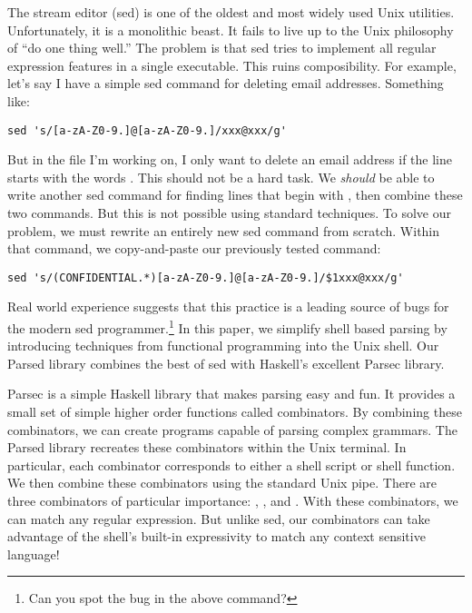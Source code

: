 \documentclass{sigplanconf}
\renewcommand{\emph}[1]{{\textit{#1}}}
\newcommand{\sh}[1]{{\ttfamily {#1}}}
\begin{document}
The stream editor (sed) is one of the oldest and most widely used Unix utilities.
Unfortunately, it is a monolithic beast.
It fails to live up to the Unix philosophy of ``do one thing well.''
The problem is that sed tries to implement all regular expression features in a single executable.
This ruins composibility.
For example, let's say I have a simple sed command for deleting email addresses.
Something like:
\begin{lstlisting}
sed 's/[a-zA-Z0-9.]@[a-zA-Z0-9.]/xxx@xxx/g'
\end{lstlisting}
But in the file I'm working on, I only want to delete an email address if the line starts with the words \sh{CONFIDENTIAL}.
This should not be a hard task.
We \emph{should} be able to write another sed command for finding lines that begin with \sh{CONFIDENTIAL},
then combine these two commands.
But this is not possible using standard techniques.
To solve our problem, we must rewrite an entirely new sed command from scratch.
Within that command, we copy-and-paste our previously tested command:
\begin{lstlisting}
sed 's/(CONFIDENTIAL.*)[a-zA-Z0-9.]@[a-zA-Z0-9.]/$1xxx@xxx/g'
\end{lstlisting}
Real world experience suggests that this practice is a leading source of bugs for the modern sed programmer.\footnote{Can you spot the bug in the above command?}
In this paper, we simplify shell based parsing by introducing techniques from functional programming into the Unix shell.
Our Parsed library combines the best of sed with Haskell's excellent Parsec library.

Parsec is a simple Haskell library that makes parsing easy and fun.
It provides a small set of simple higher order functions called combinators.
By combining these combinators, we can create programs capable of parsing complex grammars.
The Parsed library recreates these combinators within the Unix terminal.
In particular, each combinator corresponds to either a shell script or shell function.
We then combine these combinators using the standard Unix pipe.
There are three combinators of particular importance: \sh{match}, \sh{some}, and \sh{choice}.
With these combinators, we can match any regular expression.
But unlike sed, our combinators can take advantage of the shell's built-in expressivity to match any context sensitive language!
\end{document}
